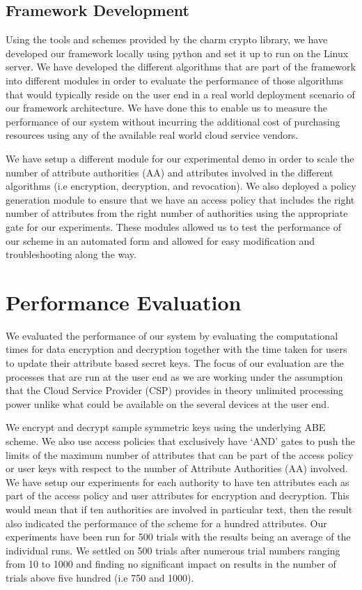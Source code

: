 \subsection{Framework Development}

Using the tools and schemes provided by the charm crypto library, we have developed our framework locally using python and set it up to run on the Linux server. We have developed the different algorithms that are part of the framework into different modules in order to evaluate the performance of those algorithms that would typically reside on the user end in a real world deployment scenario of our framework architecture. We have done this to enable us to measure the performance of our system without incurring the additional cost of purchasing resources using any of the available real world cloud service vendors.

We have setup a different module for our experimental demo in order to scale the number of attribute authorities (AA) and attributes involved in the different algorithms (i.e encryption, decryption, and revocation). We also deployed a policy generation module to ensure that we have an access policy that includes the right number of attributes from the right number of authorities using the appropriate gate for our experiments. These modules allowed us to test the performance of our scheme in an automated form and allowed for easy modification and troubleshooting along the way.

\section{Performance Evaluation}

We evaluated the performance of our system by evaluating the computational times for data encryption and decryption together with the time taken for users to update their attribute based secret keys. The focus of our evaluation are the processes that are run at the user end as we are working under the assumption that the Cloud Service Provider (CSP) provides in theory unlimited processing power unlike what could be available on the several devices at the user end.

We encrypt and decrypt sample symmetric keys using the underlying ABE scheme. We also use access policies that exclusively have `AND' gates to push the limits of the maximum number of attributes that can be part of the access policy or user keys with respect to the number of Attribute Authorities (AA) involved. We have setup our experiments for each authority to have ten attributes each as part of the access policy and user attributes for encryption and decryption. This would mean that if ten authorities are involved in particular text, then the result also indicated the performance of the scheme for a hundred attributes. Our experiments have been run for 500 trials with the results being an average of the individual runs. We settled on 500 trials after numerous trial numbers ranging from 10 to 1000 and finding no significant impact on results in the number of trials above five hundred (i.e 750 and 1000).

